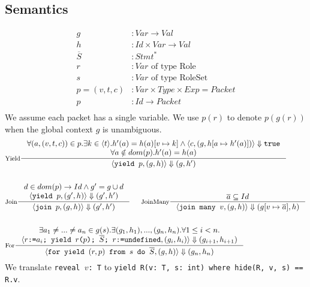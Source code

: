 \documentclass[acmsmall,review,anonymous]{acmart}\settopmatter{printfolios=true,printccs=false,printacmref=false}
\begin{document}
\subsection{Semantics}
\begin{align*}
  g &\colon Var \to Val \\
  h &\colon Id \times Var \to Val \\
  \overline{S} &\colon Stmt^\ast \\
  r &\colon Var \text{ of type Role} \\
  s &\colon Var \text{ of type RoleSet} \\
  p = (v, t, c) &\colon Var \times Type \times Exp = Packet \\
  p &\colon Id \to Packet \\
\end{align*}
We assume each packet has a single variable. We use $p(r)$ to denote $p(g(r))$ when the global context $g$ is unambiguous.
\begin{align*}
  &\inference[Yield]{
    \forall (a, (v, t, c)) \in p . \exists k \in \langle t \rangle . h'(a) = h(a)[v \mapsto k] \land \langle c, (g, h[a \mapsto h'(a)]) \rangle \Downarrow \texttt{true} \\
    \forall a \notin dom(p) . h'(a) = h(a)
  }{
    \langle \texttt{yield $p$}, (g, h) \rangle \Downarrow (g, h')
  }\\ \\
  &\inference[Join]{
    d \in dom(p) \to Id \land g' = g \cup d\\
    \langle \texttt{yield $p$}, (g', h) \rangle \Downarrow (g', h')
  }{
    \langle \texttt{join $p$}, (g, h) \rangle \Downarrow (g', h')
  }\;\;\;\;\;
  \inference[JoinMany]{
    \overline{a} \subseteq Id
  }{
    \langle \texttt{join many $v$}, (g, h) \rangle \Downarrow (g[v \mapsto \overline{a}], h)
  }\\ \\
  &\inference[For]{
    \exists a_1 \neq ... \neq a_n \in g(s) . \exists (g_1, h_1), ..., (g_n, h_n) . \forall 1 \leq i < n . \\
    \langle \texttt{$r$:=$a_i$; yield $r$($p$); $\overline{S}$; $r$:=undefined}, (g_i, h_i) \rangle \Downarrow (g_{i+1}, h_{i+1})
  }{
    \langle \texttt{for yield $(r, p)$ from $s$ do $\overline{S}$}, (g, h) \rangle \Downarrow (g_n, h_n)
  } \\
\end{align*}
We translate \texttt{reveal $v$: T} to \texttt{yield R(v: T, s: int) where hide(R, v, s) == R.v}.
\end{document}
